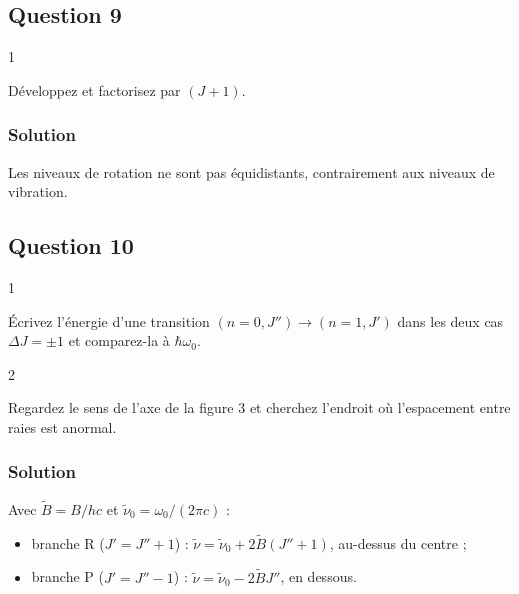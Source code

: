 \documentclass[11pt,a4paper]{article}
\providecommand{\tightlist}{\setlength{\itemsep}{0pt}\setlength{\parskip}{0pt}}
\newcommand{\equationajustee}[1]{%
  \sbox{\boiteequation}{$\displaystyle #1$}%
  \ifdim\wd\boiteequation>\linewidth
    \[\resizebox{\linewidth}{!}{\usebox{\boiteequation}}\]%
  \else
    \[#1\]%
  \fi}
\begin{document}
\hypertarget{question-9}{%
\subsection{Question 9}\label{question-9}}

\begin{indication}{1}

Développez et factorisez par \((J+1)\).

\end{indication}

\hypertarget{solution-8}{%
\subsubsection{Solution}\label{solution-8}}

\equationajustee{\begin{aligned}
\Delta E_J&=B\left[(J+1)(J+2)-J(J+1)\right]\\
&=\boxed{2B(J+1)}
\end{aligned}}

Les niveaux de rotation ne sont pas équidistants, contrairement aux niveaux de vibration.

\hypertarget{question-10}{%
\subsection{Question 10}\label{question-10}}

\begin{indication}{1}

Écrivez l'énergie d'une transition \((n=0,J'')\to(n=1,J')\) dans les deux cas \(\Delta J=\pm1\) et comparez-la à \(\hbar\omega_0\).

\end{indication}

\begin{indication}{2}

Regardez le sens de l'axe de la figure 3 et cherchez l'endroit où l'espacement entre raies est anormal.

\end{indication}

\hypertarget{solution-9}{%
\subsubsection{Solution}\label{solution-9}}

Avec \(\tilde B=B/hc\) et \(\tilde\nu_0=\omega_0/(2\pi c)\) :

\begin{itemize}
\tightlist
\item
  branche R (\(J'=J''+1\)) : \(\tilde\nu=\tilde\nu_0+2\tilde B(J''+1)\), au-dessus du centre ;
\item
  branche P (\(J'=J''-1\)) : \(\tilde\nu=\tilde\nu_0-2\tilde BJ''\), en dessous.
\end{itemize}
\end{document}
